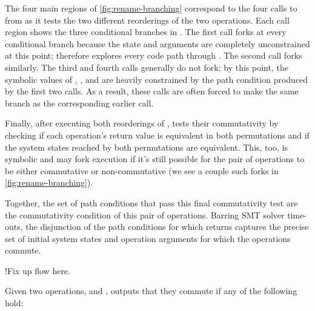 The four main regions of \cref{fig:rename-branching} correspond to the
four calls to  from  as it tests the two
different reorderings of the two operations.  Each call region shows
the three conditional branches in .  The first call forks
at every conditional branch because the state and arguments are
completely unconstrained at this point; \analyzer therefore explores
every code path through .  The second call forks
similarly.  The third and fourth calls generally do not fork; by this
point, the symbolic values of , , and
 are heavily constrained by the path condition produced by
the first two calls.  As a result, these calls are often forced to
make the same branch as the corresponding earlier call.

Finally, after executing both reorderings of ,
 tests their commutativity by checking if each
operation's return value is equivalent in both permutations and if the
system states reached by both permutations are equivalent.  This, too,
is symbolic and may fork execution if it's still possible for the pair
of operations to be either commutative or non-commutative (we see a
couple such forks in \cref{fig:rename-branching}).

Together, the set of path conditions that pass this final
commutativity test are the commutativity condition of this pair of
operations.  Barring SMT solver time-outs, the disjunction of the path
conditions for which  returns  captures the
precise set of initial system states and operation arguments for which
the operations commute.

\XXX!{Fix up flow here.}

Given two
 operations,  and ,
\analyzer outputs that they commute if any of the following hold:

